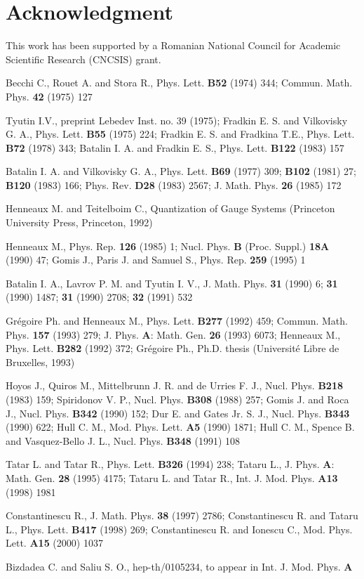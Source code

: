 \documentclass[a4paper,10pt]{article}
\begin{document}
\section*{Acknowledgment}
This work has been supported by a Romanian National Council for Academic
Scientific Research (CNCSIS) grant.

\begin{thebibliography}{99}
  Becchi C., Rouet A. and Stora R.,
Phys. Lett. {\bf{B52}} (1974) 344;
Commun. Math. Phys. {\bf{42}} (1975) 127

  Tyutin I.V., preprint Lebedev Inst. no. 39 (1975);
Fradkin E. S. and Vilkovisky G. A.,
Phys. Lett. {\bf{B55}} (1975) 224;
Fradkin E. S. and Fradkina T.E.,
Phys. Lett. {\bf{B72}} (1978) 343;
Batalin I. A. and Fradkin E. S.,
Phys. Lett. {\bf{B122}} (1983) 157

  Batalin I. A. and Vilkovisky G. A.,
Phys. Lett. {\bf{B69}} (1977) 309;
{\bf{B102}} (1981) 27;
{\bf{B120}} (1983) 166;
Phys. Rev. {\bf{D28}} (1983) 2567;
J. Math. Phys. {\bf{26}} (1985) 172

  Henneaux M. and Teitelboim C.,
Quantization of Gauge Systems
(Princeton University Press, Princeton, 1992)

  Henneaux M.,
Phys. Rep. {\bf{126}} (1985) 1;
Nucl. Phys. {\bf{B}} (Proc. Suppl.) {\bf{18A}} (1990) 47;
Gomis J., Paris J. and Samuel S.,
Phys. Rep. {\bf{259}} (1995) 1

  Batalin I. A., Lavrov P. M. and Tyutin I. V.,
J. Math. Phys. {\bf{31}} (1990) 6;
{\bf{31}} (1990) 1487;
{\bf{31}} (1990) 2708;
{\bf{32}} (1991) 532

  Gr\'{e}goire Ph. and Henneaux M.,
Phys. Lett. {\bf{B277}} (1992) 459;
Commun. Math. Phys. {\bf{157}} (1993) 279;
J. Phys. {\bf{A}}: Math. Gen. {\bf{26}} (1993) 6073;
Henneaux M.,
Phys. Lett. {\bf{B282}} (1992) 372;
Gr\'{e}goire Ph., Ph.D. thesis (Universit\'{e} Libre de
Bruxelles, 1993)

  Hoyos J., Quiros M., Mittelbrunn J. R. and 
de Urries F. J.,
Nucl. Phys. {\bf{B218}} (1983) 159;
Spiridonov V. P.,
Nucl. Phys. {\bf{B308}} (1988) 257;
Gomis J. and Roca J.,
Nucl. Phys. {\bf{B342}} (1990) 152;
Dur E. and Gates Jr. S. J.,
Nucl. Phys. {\bf{B343}} (1990) 622;
Hull C. M.,
Mod. Phys. Lett. {\bf{A5}} (1990) 1871;
Hull C. M., Spence B. and Vasquez-Bello J. L.,
Nucl. Phys. {\bf{B348}} (1991) 108

  Tatar L. and Tatar R.,
Phys. Lett. {\bf{B326}} (1994) 238;
Tataru L.,
J. Phys. {\bf{A}}: Math. Gen. {\bf{28}} (1995) 4175;
Tataru L. and Tatar R.,
Int. J. Mod. Phys. {\bf{A13}} (1998) 1981

  Constantinescu R.,
J. Math. Phys. {\bf{38}} (1997) 2786;
Constantinescu R. and Tataru L.,
Phys. Lett. {\bf{B417}} (1998) 269;
Constantinescu R. and Ionescu C.,
Mod. Phys. Lett. {\bf{A15}} (2000) 1037

  Bizdadea C. and Saliu S. O.,
hep-th/0105234, to appear in Int. J. Mod. Phys. {\bf{A}}
\end{thebibliography}
\end{document}
